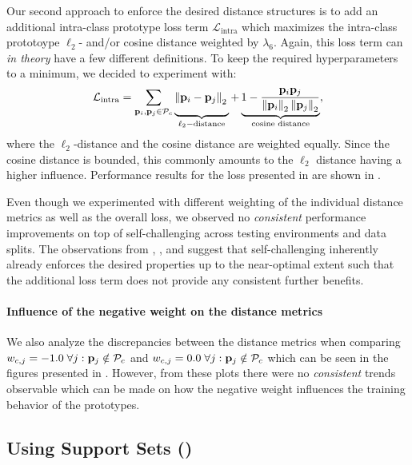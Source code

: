 Our second approach to enforce the desired distance structures is to add an additional intra-class prototype loss term $\mathcal{L}_\mathrm{intra}$ which maximizes the intra-class prototoype $\ell_2$- and/or cosine distance weighted by $\lambda_6$. Again, this loss term can \emph{in theory} have a few different definitions. To keep the required hyperparameters to a minimum, we decided to experiment with:
\begin{equation}
\label{eq:intra_loss}
    \mathcal{L}_\mathrm{intra} = \sum_{\proti_i, \prot \in \prots_c} \underbrace{\left\|\proti_i - \prot  \right\|_2 \vphantom{\frac{\proti_i\prot}{\left\|\proti_i \right\|_2 \left\|\prot \right\|_2}}}_{\ell_2-\text{distance}} + \underbrace{ 1-\frac{\proti_i\prot}{\left\|\proti_i \right\|_2 \left\|\prot \right\|_2}}_{\text{cosine distance}},
\end{equation}
where the $\ell_2$-distance and the cosine distance are weighted equally. Since the cosine distance is bounded, this commonly amounts to the $\ell_2$ distance having a higher influence. Performance results for the loss presented in  are shown in . 

Even though we experimented with different weighting of the individual distance metrics as well as the overall loss, we observed no \emph{consistent} performance improvements on top of self-challenging across testing environments and data splits. The observations from , , and  suggest that self-challenging inherently already enforces the desired properties up to the near-optimal extent such that the additional loss term does not provide any consistent further benefits.

\paragraph{Influence of the negative weight on the distance metrics}
We also analyze the discrepancies between the distance metrics when comparing $w_{c,j} = -1.0\; \forall j: \mathbf{p}_{j} \notin \mathcal{P}_c$ and $w_{c,j} = 0.0\; \forall j: \mathbf{p}_{j} \notin \mathcal{P}_c$ which can be seen in the figures presented in . However, from these plots there were no \emph{consistent} trends observable which can be made on how the negative weight influences the training behavior of the prototypes. 

\subsection{Using Support Sets (\dtransformers)}

